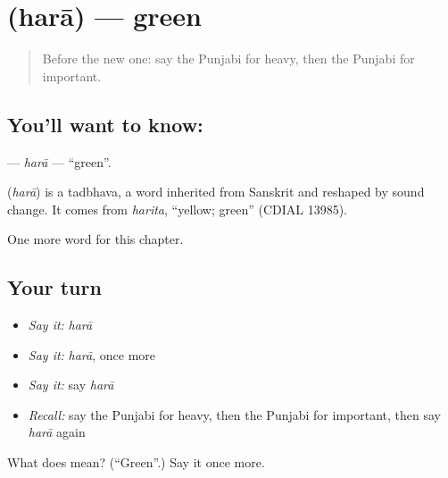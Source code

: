 \section[\texorpdfstring{\pa{ਹਰਾ} (harā)}{ਹਰਾ (harā)}]{ (harā) — green}

\label{lesson:PA-C83-hara}



\begin{quote}
Before the new one: say the Punjabi for heavy, then the Punjabi for important.
\end{quote}

\subsection*{You'll want to know: }
\textbf{} — \emph{harā} — \textquotedblleft{}green\textquotedblright{}.

\begin{cousinweb}
\textbf{} (\emph{harā}) is a tadbhava, a word inherited from Sanskrit and reshaped by sound change. It comes from \emph{harita}, \textquotedblleft{}yellow; green\textquotedblright{} (CDIAL 13985).
\end{cousinweb}

\begin{grammarlens}[title={What you've built}]
One more word for this chapter.
\end{grammarlens}

\subsection*{Your turn}
\begin{itemize}
\raggedright
  \item \emph{Say it:} \emph{harā}
  \item \emph{Say it:} \emph{harā}, once more
  \item \emph{Say it:} say \emph{harā}
  \item \emph{Recall:} say the Punjabi for heavy, then the Punjabi for important, then say \emph{harā} again
\end{itemize}

\begin{tcolorbox}[breakable,colback=teal!4,colframe=teal!35!black,title={Before you move on}]
What does  mean? (\textquotedblleft{}Green\textquotedblright{}.) Say it once more.
\end{tcolorbox}
